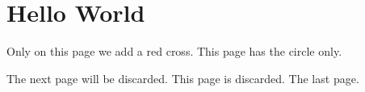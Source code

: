 \documentclass[a4paper]{article}
\begin{document}
\section{Hello World}
\newpage
{}
Only on this page we add a red cross.
\newpage
This page has the circle only.
\par
\vspace{\fill}
The next page will be discarded.
\newpage
\AtBeginShipoutNext{%
  \AtBeginShipoutDiscard
}
This page is discarded.
\newpage
The last page.
\end{document}
